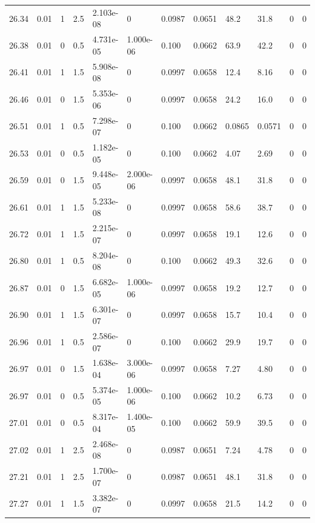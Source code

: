 \documentclass[preview]{standalone}
\begin{document}
{{{{{{\begin{tabular}{L{1.2cm}C{1.2cm} C{0.3cm}C{0.5cm} C{1.4cm}C{1.4cm} C{1.4cm}C{1.4cm} C{1.6cm}C{1.6cm} C{1.6cm}C{1.6cm}}
  26.34  &  0.01  & 1     & 2.5 &  2.103e-08  & 0  &  0.0987&   0.0651& 48.2 & 31.8   &  0 & 0  \\ 
  26.38  &  0.01  & 0     & 0.5 &  4.731e-05  & 1.000e-06  &  0.100&   0.0662& 63.9 & 42.2   &  0 & 0  \\ 
  26.41  &  0.01  & 1     & 1.5 &  5.908e-08  & 0  &  0.0997&   0.0658& 12.4 & 8.16   &  0 & 0  \\ 
  26.46  &  0.01  & 0     & 1.5 &  5.353e-06  & 0  &  0.0997&   0.0658& 24.2 & 16.0   &  0 & 0  \\ 
  26.51  &  0.01  & 1     & 0.5 &  7.298e-07  & 0  &  0.100&   0.0662& 0.0865 & 0.0571   &  0 & 0  \\ 
  26.53  &  0.01  & 0     & 0.5 &  1.182e-05  & 0  &  0.100&   0.0662& 4.07 & 2.69   &  0 & 0  \\ 
  26.59  &  0.01  & 0     & 1.5 &  9.448e-05  & 2.000e-06  &  0.0997&   0.0658& 48.1 & 31.8   &  0 & 0  \\ 
  26.61  &  0.01  & 1     & 1.5 &  5.233e-08  & 0  &  0.0997&   0.0658& 58.6 & 38.7   &  0 & 0  \\ 
  26.72  &  0.01  & 1     & 1.5 &  2.215e-07  & 0  &  0.0997&   0.0658& 19.1 & 12.6   &  0 & 0  \\ 
  26.80  &  0.01  & 1     & 0.5 &  8.204e-08  & 0  &  0.100&   0.0662& 49.3 & 32.6   &  0 & 0  \\ 
  26.87  &  0.01  & 0     & 1.5 &  6.682e-05  & 1.000e-06  &  0.0997&   0.0658& 19.2 & 12.7   &  0 & 0  \\ 
  26.90  &  0.01  & 1     & 1.5 &  6.301e-07  & 0  &  0.0997&   0.0658& 15.7 & 10.4   &  0 & 0  \\ 
  26.96  &  0.01  & 1     & 0.5 &  2.586e-07  & 0  &  0.100&   0.0662& 29.9 & 19.7   &  0 & 0  \\ 
  26.97  &  0.01  & 0     & 1.5 &  1.638e-04  & 3.000e-06  &  0.0997&   0.0658& 7.27 & 4.80   &  0 & 0  \\ 
  26.97  &  0.01  & 0     & 0.5 &  5.374e-05  & 1.000e-06  &  0.100&   0.0662& 10.2 & 6.73   &  0 & 0  \\ 
  27.01  &  0.01  & 0     & 0.5 &  8.317e-04  & 1.400e-05  &  0.100&   0.0662& 59.9 & 39.5   &  0 & 0  \\ 
  27.02  &  0.01  & 1     & 2.5 &  2.468e-08  & 0  &  0.0987&   0.0651& 7.24 & 4.78   &  0 & 0  \\ 
  27.21  &  0.01  & 1     & 2.5 &  1.700e-07  & 0  &  0.0987&   0.0651& 48.1 & 31.8   &  0 & 0  \\ 
  27.27  &  0.01  & 1     & 1.5 &  3.382e-07  & 0  &  0.0997&   0.0658& 21.5 & 14.2   &  0 & 0  \\ 

\end{tabular}}}}}}}
\end{document}
